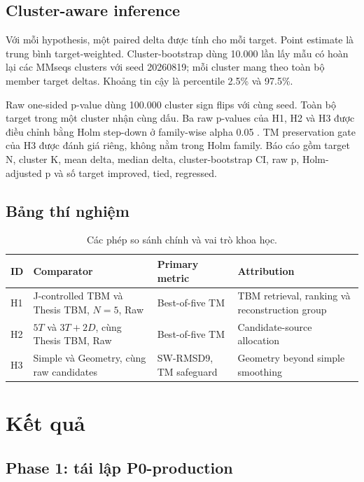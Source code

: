 \documentclass[12pt,a4paper,oneside]{report}
\begin{document}
\section{Cluster-aware inference}

Với mỗi hypothesis, một paired delta được tính cho mỗi target. Point estimate là trung
bình target-weighted. Cluster-bootstrap dùng 10.000 lần lấy mẫu có hoàn lại các MMseqs
clusters với seed 20260819; mỗi cluster mang theo toàn bộ member target deltas. Khoảng
tin cậy là percentile 2.5\% và 97.5\%.

Raw one-sided p-value dùng 100.000 cluster sign flips với cùng seed. Toàn bộ target
trong một cluster nhận cùng dấu. Ba raw p-values của H1, H2 và H3 được điều chỉnh bằng
Holm step-down ở family-wise alpha 0.05 \cite{bootstrap}. TM preservation gate của H3
được đánh giá riêng, không nằm trong Holm family. Báo cáo gồm target N, cluster K,
mean delta, median delta, cluster-bootstrap CI, raw p, Holm-adjusted p và số target
improved, tied, regressed.

\section{Bảng thí nghiệm}

\begin{table}[H]
\centering
\caption{Các phép so sánh chính và vai trò khoa học.}
\begin{tabularx}{\textwidth}{p{1.0cm}p{4.1cm}p{3.2cm}X}
\toprule
ID & Comparator & Primary metric & Attribution \\
\midrule
H1 & J-controlled TBM và Thesis TBM, $N=5$, Raw & Best-of-five TM & TBM retrieval, ranking và reconstruction group \\
H2 & $5T$ và $3T+2D$, cùng Thesis TBM, Raw & Best-of-five TM & Candidate-source allocation \\
H3 & Simple và Geometry, cùng raw candidates & SW-RMSD9, TM safeguard & Geometry beyond simple smoothing \\
\bottomrule
\end{tabularx}
\end{table}

\chapter{Kết quả}

\section{Phase 1: tái lập P0-production}
\end{document}
